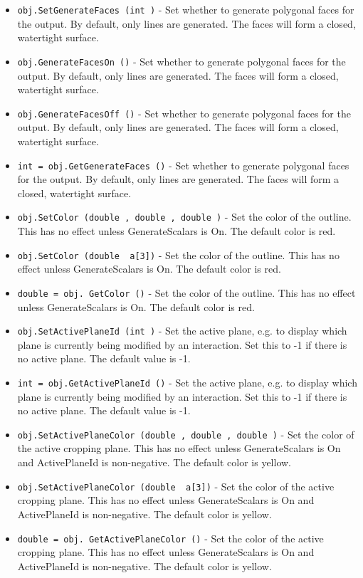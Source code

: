 \begin{itemize}
\item  \verb|obj.SetGenerateFaces (int )| -  Set whether to generate polygonal faces for the output.  By default,
 only lines are generated.  The faces will form a closed, watertight
 surface.

\item  \verb|obj.GenerateFacesOn ()| -  Set whether to generate polygonal faces for the output.  By default,
 only lines are generated.  The faces will form a closed, watertight
 surface.

\item  \verb|obj.GenerateFacesOff ()| -  Set whether to generate polygonal faces for the output.  By default,
 only lines are generated.  The faces will form a closed, watertight
 surface.

\item  \verb|int = obj.GetGenerateFaces ()| -  Set whether to generate polygonal faces for the output.  By default,
 only lines are generated.  The faces will form a closed, watertight
 surface.

\item  \verb|obj.SetColor (double , double , double )| -  Set the color of the outline.  This has no effect unless GenerateScalars
 is On.  The default color is red.

\item  \verb|obj.SetColor (double  a[3])| -  Set the color of the outline.  This has no effect unless GenerateScalars
 is On.  The default color is red.

\item  \verb|double = obj. GetColor ()| -  Set the color of the outline.  This has no effect unless GenerateScalars
 is On.  The default color is red.

\item  \verb|obj.SetActivePlaneId (int )| -  Set the active plane, e.g. to display which plane is currently being
 modified by an interaction.  Set this to -1 if there is no active plane.
 The default value is -1.

\item  \verb|int = obj.GetActivePlaneId ()| -  Set the active plane, e.g. to display which plane is currently being
 modified by an interaction.  Set this to -1 if there is no active plane.
 The default value is -1.

\item  \verb|obj.SetActivePlaneColor (double , double , double )| -  Set the color of the active cropping plane.  This has no effect unless
 GenerateScalars is On and ActivePlaneId is non-negative.  The default
 color is yellow. 

\item  \verb|obj.SetActivePlaneColor (double  a[3])| -  Set the color of the active cropping plane.  This has no effect unless
 GenerateScalars is On and ActivePlaneId is non-negative.  The default
 color is yellow. 

\item  \verb|double = obj. GetActivePlaneColor ()| -  Set the color of the active cropping plane.  This has no effect unless
 GenerateScalars is On and ActivePlaneId is non-negative.  The default
 color is yellow. 

\end{itemize}
